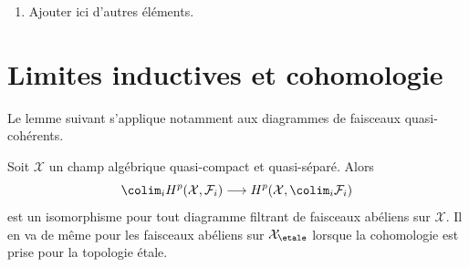 \begin{enumerate}
\begin{align*}
f^*\mathcal{G})|_{U_\etale} \\
& =
\SheafHom_{\mathcal{O}_U}(f^*\mathcal{F}|_{U_\etale},
f^*\mathcal{G}|_{U_\etale})
\end{align*}
La première égalité résulte de la construction de $hom$. La deuxième
résulte de (7). La troisième résulte de la définition de $c$. La quatrième résulte de
Modules sur les sites, lemme \ref{sites-modules-lemma-pullback-internal-hom}.
La dernière égalité résulte de la même référence appliquée au morphisme plat
de topos annelés $i_U (U_\etale, \mathcal{O}_U) \to
(\mathcal{U}_\etale, \mathcal{O}_\mathcal{U})$ de
Faisceaux sur les champs, lemme \ref{stacks-sheaves-lemma-compare}.
\item Ajouter ici d'autres éléments.
\end{enumerate}






\section{Limites inductives et cohomologie}
\label{section-colimits}

\noindent
Le lemme suivant s'applique notamment aux diagrammes de faisceaux
quasi-cohérents.

\begin{lemma}
\label{lemma-colimits}
Soit $\mathcal{X}$ un champ algébrique quasi-compact et quasi-séparé.
Alors
$$
\colim_i H^p(\mathcal{X}, \mathcal{F}_i)
\longrightarrow
H^p(\mathcal{X}, \colim_i \mathcal{F}_i)
$$
est un isomorphisme pour tout diagramme filtrant de faisceaux abéliens sur
$\mathcal{X}$. Il en va de même pour les faisceaux abéliens sur $\mathcal{X}_\etale$
lorsque la cohomologie est prise pour la topologie étale.
\end{lemma}

